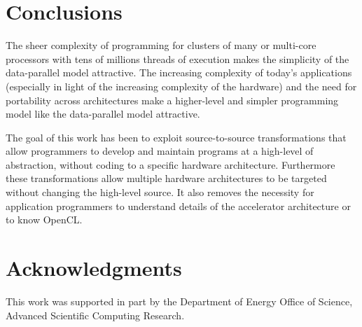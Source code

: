 \documentclass{doublecol-new}
\begin{document}





\maketitle






%


\section{Conclusions}

The sheer complexity of programming for clusters of many or multi-core
processors with tens of millions threads of execution makes the simplicity of
the data-parallel model attractive.  The increasing complexity of
today's applications (especially in light of the increasing complexity
of the hardware) and the need for portability across architectures
make a higher-level and simpler programming model like the data-parallel
model attractive.

The goal of this work has been to exploit source-to-source transformations that
allow programmers to develop and maintain programs at a high-level of
abstraction, without coding to a specific hardware architecture.
Furthermore these transformations allow multiple hardware architectures
to be targeted without changing the high-level source.  It also removes the
necessity for application programmers to understand details of the accelerator
architecture or to know OpenCL.


\section{Acknowledgments}
This work was supported in part by the Department of Energy Office of Science,
Advanced Scientific Computing Research.


%
\newcommand{\newblock}{}



%
%
\end{document}
